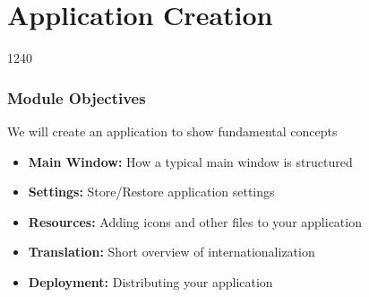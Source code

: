 %
%
%
%

\section{Application Creation}

\begin{slide}{1240}
\label{paint-application}
\frametitle{Module Objectives}

We will create an application to show fundamental concepts

\begin{itemize}
\item \textbf{Main Window:} How a typical main window is structured
\item \textbf{Settings:} Store/Restore application settings
\item \textbf{Resources:} Adding icons and other files to your application
\item \textbf{Translation:} Short overview of internationalization
\item \textbf{Deployment:} Distributing your application
\end{itemize}

\end{slide}







